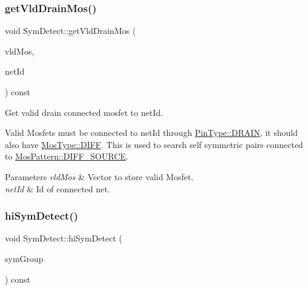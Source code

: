 \subsubsection{\texorpdfstring{get\+Vld\+Drain\+Mos()}{getVldDrainMos()}}
{\footnotesize\ttfamily void Sym\+Detect\+::get\+Vld\+Drain\+Mos (\begin{DoxyParamCaption}\item[{std\+::vector$<$ \hyperlink{type_8h_a581e8093e28e7362f2b6937296190676}{Index\+Type} $>$ \&}]{vld\+Mos,  }\item[{\hyperlink{type_8h_a581e8093e28e7362f2b6937296190676}{Index\+Type}}]{net\+Id }\end{DoxyParamCaption}) const\hspace{0.3cm}{\ttfamily [private]}}



Get valid drain connected mosfet to net\+Id. 

Valid Mosfets must be connected to net\+Id through \hyperlink{type_8h_afaab50027002ecbb6c8ac27e727d1bb4ad22e8f7ce637479aeffe9dab9ee7337d}{Pin\+Type\+::\+D\+R\+A\+IN}, it should also have \hyperlink{type_8h_a34a6a66323cfecf83dfe00bc8fd96333aa2e1ec2dd3d8195d238c5494f0ac5578}{Mos\+Type\+::\+D\+I\+FF}. This is used to search self symmetric pairs connected to \hyperlink{type_8h_af19eddb079bfea723256710b029c38e8ad45b64a7d6b85dde1b52dd5a18863933}{Mos\+Pattern\+::\+D\+I\+F\+F\+\_\+\+S\+O\+U\+R\+CE}.


\begin{DoxyParams}{Parameters}
{\em vld\+Mos} & Vector to store valid Mosfet. \\
\hline
{\em net\+Id} & Id of connected net. \\
\hline
\end{DoxyParams}
\mbox{\label{classSymDetect_a81ec317ab0f508b3e0af483ef8a2c1ac}} 
\subsubsection{\texorpdfstring{hi\+Sym\+Detect()}{hiSymDetect()}}
{\footnotesize\ttfamily void Sym\+Detect\+::hi\+Sym\+Detect (\begin{DoxyParamCaption}\item[{std\+::vector$<$ std\+::vector$<$ \hyperlink{classMosPair}{Mos\+Pair} $>$$>$ \&}]{sym\+Group }\end{DoxyParamCaption}) const}




